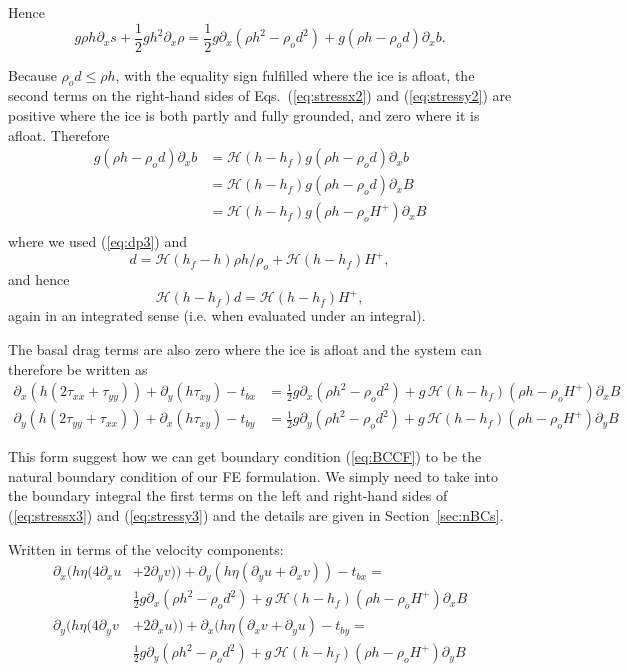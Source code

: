 \documentclass[10pt,a4paper]{book}
\newcommand{\He}{\mathcal{H}}
\newcommand{\p}{\partial}
\newcommand{\tbx}{t_{bx}}
\newcommand{\tby}{t_{by}}
\newcommand{\txx}{\tau_{xx}}
\newcommand{\tyy}{\tau_{yy}}
\newcommand{\txy}{\tau_{xy}}
\begin{document}
Hence
\begin{equation}
 g  \rho h \p_x s + \frac{1}{2} g h^2 \p_x \rho  = \frac{1}{2} g \p_x (\rho h^2 - \rho_o d^2)+g(\rho h -\rho_o d) \p_x b .
\label{eq:gencase}
\end{equation}

Because $\rho_o d \le \rho h$, with the equality sign fulfilled where
the ice is afloat, the second terms on the right-hand sides of
Eqs.~(\ref{eq:stressx2}) and (\ref{eq:stressy2}) are positive where
the ice is both partly and fully grounded, and zero where it is
afloat.  Therefore
\begin{align*} 
g(\rho h -\rho_o d) \p_x b &=  \He(h-h_f) g(\rho h -\rho_o d) \p_x b \\
                          &=  \He(h-h_f) g(\rho h -\rho_o d) \p_x B \\ 
                          &=  \He(h-h_f) g(\rho h -\rho_o H^{+}) \p_x B \\ 
\end{align*}
where we used (\ref{eq:dp3}) and
\[
 d=  \He(h_f-h) \rho h/\rho_o + \He(h-h_f) H^{+} ,
\]
and hence
\[
 \He(h-h_f) d=  \He(h-h_f) H^{+} ,
\]
again in an integrated sense (i.e. when evaluated under an integral).

The basal drag terms are also zero where the ice is afloat and the
system can therefore be written as
\begin{align} 
\p_x ( h ( 2 \txx + \tyy)) +\p_y ( h \txy) -  \tbx
&=\frac{1}{2} g \p_x (\rho h^2 - \rho_o d^2)+ g\,\He(h-h_f) (\rho h -\rho_o H^{+}) \p_x B 
\label{eq:stressx3}\\
\p_y (  h ( 2 \tyy + \txx)) +\p_x ( h \txy ) - \tby
&=\frac{1}{2} g \p_y (\rho h^2 - \rho_o d^2)+g\,\He(h-h_f) (\rho h -\rho_o H^{+}) \p_y B
\label{eq:stressy3}
\end{align}

This form suggest how we can get boundary condition (\ref{eq:BCCF}) to
be the natural boundary condition of our FE formulation. We simply
need to take into the boundary integral the first terms on the left
and right-hand sides of (\ref{eq:stressx3}) and (\ref{eq:stressy3}) and
the details are given in Section~\ref{sec:nBCs}.


Written in terms of the velocity components: 
\begin{align} 
\p_x ( h \eta ( 4 \p_x u &+ 2 \p_y v)) + \p_y ( h \eta (\p_y u + \p_x v) ) - \tbx = \nonumber \\
& \frac{1}{2} g \p_x (\rho h^2 - \rho_o d^2)+ g\,\He(h-h_f) (\rho h -\rho_o H^{+}) \p_x B 
\label{eq:vel3x}\\
\p_y (  h \eta ( 4 \p_y v &+ 2 \p_x u )) +\p_x ( h \eta (\p_x v + \p_y u ) -  \tby = \nonumber \\
& \frac{1}{2} g \p_y (\rho h^2 - \rho_o d^2)+g\,\He(h-h_f) (\rho h -\rho_o H^{+}) \p_y B
\label{eq:vel3y}
\end{align}
\end{document}
